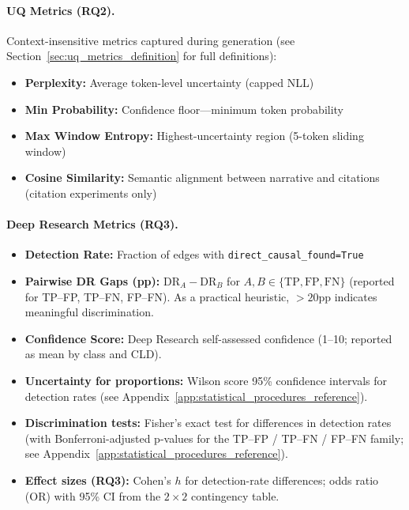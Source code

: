\paragraph{UQ Metrics (RQ2).} Context-insensitive metrics captured during generation (see Section~\ref{sec:uq_metrics_definition} for full definitions):
\begin{itemize}[noitemsep]
    \item \textbf{Perplexity:} Average token-level uncertainty (capped NLL)
    \item \textbf{Min Probability:} Confidence floor---minimum token probability
    \item \textbf{Max Window Entropy:} Highest-uncertainty region (5-token sliding window)
    \item \textbf{Cosine Similarity:} Semantic alignment between narrative and citations (citation experiments only)
\end{itemize}

\paragraph{Deep Research Metrics (RQ3).}
\begin{itemize}[noitemsep]
    \item \textbf{Detection Rate:} Fraction of edges with \texttt{direct\_causal\_found=True}
    \item \textbf{Pairwise DR Gaps (pp):} $\text{DR}_{A} - \text{DR}_{B}$ for $A,B\in\{\text{TP},\text{FP},\text{FN}\}$ (reported for TP--FP, TP--FN, FP--FN). As a practical heuristic, $>20$pp indicates meaningful discrimination.
    \item \textbf{Confidence Score:} Deep Research self-assessed confidence (1--10; reported as mean by class and CLD).
    \item \textbf{Uncertainty for proportions:} Wilson score 95\% confidence intervals for detection rates (see Appendix~\ref{app:statistical_procedures_reference}).
    \item \textbf{Discrimination tests:} Fisher's exact test for differences in detection rates (with Bonferroni-adjusted p-values for the TP--FP / TP--FN / FP--FN family; see Appendix~\ref{app:statistical_procedures_reference}).
    \item \textbf{Effect sizes (RQ3):} Cohen's $h$ for detection-rate differences; odds ratio (OR) with 95\% CI from the $2\times2$ contingency table.
\end{itemize}

